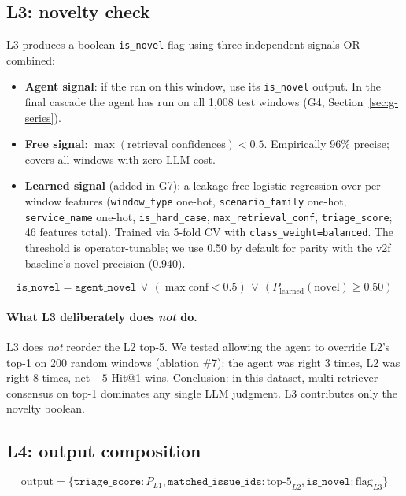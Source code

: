 \subsection{L3: novelty check}

L3 produces a boolean \texttt{is\_novel} flag using three independent signals OR-combined:

\begin{itemize}
\item \textbf{Agent signal}: if the \agent{} ran on this window, use its \texttt{is\_novel} output. In the final cascade the agent has run on all 1{,}008 test windows (G4, Section~\ref{sec:g-series}).
\item \textbf{Free signal}: $\max(\text{retrieval confidences}) < 0.5$. Empirically 96\% precise; covers all windows with zero LLM cost.
\item \textbf{Learned signal} (added in G7): a leakage-free logistic regression over per-window features (\texttt{window\_type} one-hot, \texttt{scenario\_family} one-hot, \texttt{service\_name} one-hot, \texttt{is\_hard\_case}, \texttt{max\_retrieval\_conf}, \texttt{triage\_score}; 46 features total). Trained via 5-fold CV with \texttt{class\_weight=balanced}. The threshold is operator-tunable; we use 0.50 by default for parity with the v2f baseline's novel precision (0.940).
\end{itemize}

\[
\texttt{is\_novel} = \texttt{agent\_novel} \,\lor\, (\max\mathrm{conf} < 0.5) \,\lor\, (P_{\text{learned}}(\text{novel}) \geq 0.50)
\]

\paragraph{What L3 deliberately does \emph{not} do.}
L3 does \emph{not} reorder the L2 top-5. We tested allowing the agent to override L2's top-1 on 200 random windows (ablation \#7): the agent was right 3 times, L2 was right 8 times, net $-5$ Hit@1 wins. Conclusion: in this dataset, multi-retriever consensus on top-1 dominates any single LLM judgment. L3 contributes only the novelty boolean.

\subsection{L4: output composition}

\[
\text{output} = \{
  \texttt{triage\_score}: P_{L1},
  \texttt{matched\_issue\_ids}: \text{top-5}_{L2},
  \texttt{is\_novel}: \text{flag}_{L3}
\}
\]


